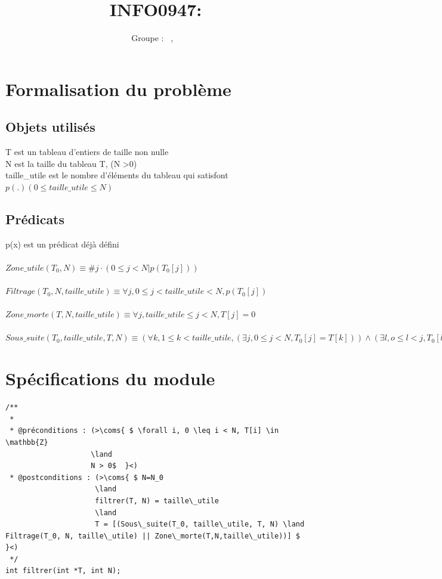 \documentclass[a4paper, 11pt, oneside]{article}
\title{INFO0947: \intitule}
\author{Groupe \GrNbr : \PrenomUN~\textsc{\NomUN}, \PrenomDEUX~\textsc{\NomDEUX}}
\date{}
\newcommand{\coms}[1]{\textcolor{MidnightBlue}{#1}}
\newcommand{\tablemat}{~}
\renewcommand{\tablemat}{\tableofcontents}
\begin{document}
\maketitle
\newpage
\tablemat
\newpage


\section{Formalisation du problème}
\subsection{Objets utilisés}

T est un tableau d'entiers de taille non nulle
\\
N est la taille du tableau T,  (N \textgreater 0)
\\
taille\_utile est le nombre d'éléments du tableau qui satisfont $p(.) (0 \leq taille\_utile \leq N  )$

\subsection{Prédicats}
p(x) est un prédicat déjà défini 
\\
\\
$Zone\_utile(T_{0},  N)  \equiv \#j \cdot (0\leq j < N|  p(T_{0}[j]))  $
\\
\\
$Filtrage(T_{0}, N,taille\_utile)\equiv \forall j, 0 \leq j < taille\_utile < N, p(T_{0}[j])$\\
\\
$Zone\_morte(T, N,taille\_utile)\equiv \forall j, taille\_utile \leq j < N, T[j] = 0$ 
\\
\\
$Sous\_suite(T_0, taille\_utile, T, N)\equiv (\forall k, 1 \leq k < taille\_utile, (\exists j, 0 \leq j<N, T_0[j]=T[k]))\land(\exists l, o \leq l < j, T_0[l]=T[k-1]) $


\section{Spécifications du module}


\begin{lstlisting}
/**
 *
 * @préconditions : (>\coms{ $ \forall i, 0 \leq i < N, T[i] \in \mathbb{Z}
                    \land
                    N > 0$  }<)
 * @postconditions : (>\coms{ $ N=N_0
                     \land 
                     filtrer(T, N) = taille\_utile
                     \land 
                     T = [(Sous\_suite(T_0, taille\_utile, T, N) \land Filtrage(T_0, N, taille\_utile) || Zone\_morte(T,N,taille\_utile))] $  }<)
 */
int filtrer(int *T, int N);

\end{lstlisting}
\end{document}
